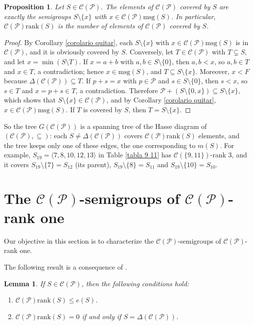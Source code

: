\documentclass[11pt]{article}
\newtheorem{proposition}[theorem]{Proposition}
\newtheorem{lemma}[theorem]{Lemma}
\numberwithin{equation}{section}
\newcommand{\CP}{\mathcal C(\mathcal P)}
\newcommand{\rk}{\mathrm{rank}}
\newcommand{\msg}{\mathrm{msg}}
\begin{document}
\begin{proposition}\label{proposicion Hasse}
Let $S\in\CP$. The elements of $\CP$ covered by $S$ are exactly the semigroups $S\setminus\{x\}$ with $x\in\CP\msg(S)$. In particular, $\CP\rk(S)$ is the number of elements of $\CP$ covered by $S$.
\end{proposition}

\begin{proof}
By Corollary \ref{corolario quitar}, each $S\setminus\{x\}$ with $x\in\CP\msg(S)$ is in $\CP$, and it is obviously covered by $S$. Conversely, let $T\in\CP$ with $T\subsetneq S$, and let $x=\min(S\setminus T)$. If $x=a+b$ with $a,b\in S\setminus\{0\}$, then $a,b<x$, so $a,b\in T$ and $x\in T$, a contradiction; hence $x\in\msg(S)$, and $T\subseteq S\setminus\{x\}$. Moreover, $x<F$ because $\Delta(\CP)\subseteq T$. If $p+s=x$ with $p\in\mathcal P$ and $s\in S\setminus\{0\}$, then $s<x$, so $s\in T$ and $x=p+s\in T$, a contradiction. Therefore $\mathcal P+(S\setminus\{0,x\})\subseteq S\setminus\{x\}$, which shows that $S\setminus\{x\}\in\CP$, and by Corollary \ref{corolario quitar}, $x\in\CP\msg(S)$. If $T$ is covered by $S$, then $T=S\setminus\{x\}$.
\end{proof}

So the tree $G(\CP)$ is a spanning tree of the Hasse diagram of $(\CP,\subseteq)$: each $S\neq\Delta(\CP)$ covers $\CP\rk(S)$ elements, and the tree keeps only one of these edges, the one corresponding to $m(S)$. For example, $S_{19}=\langle 7,8,10,12,13\rangle$ in Table \ref{tabla 9 11} has $\mathcal C(\{9,11\})$-rank $3$, and it covers $S_{19}\setminus\{7\}=S_{12}$ (its parent), $S_{19}\setminus\{8\}=S_{11}$ and $S_{19}\setminus\{10\}=S_{10}$.

\section{The \texorpdfstring{$\mathcal C(\mathcal P)$}{C(P)}-\texorpdfstring{semigroups}{semigroups} of \texorpdfstring{$\mathcal C(\mathcal P)$}{C(P)}-rank one}\label{sec:rankone}

Our objective in this section is to characterize the $\mathcal C(\mathcal P)$-semigroups of $\mathcal C(\mathcal P)$-rank one.

The following result is a consequence of \cite[Propositions 6.1 and 6.2]{covariedades}.

\begin{lemma}
    If $S\in \mathcal C(\mathcal P)$, then the following conditions hold:
    \begin{enumerate}
        \item $\CP\rk(S)\leq e(S)$.
        \item $\CP\rk(S)=0$ if and only if $S=\Delta(\mathcal C(\mathcal P))$.
    \end{enumerate}
\end{lemma}
\end{document}
